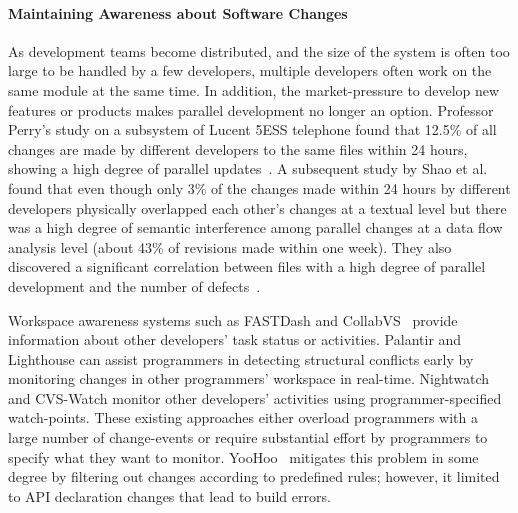 \documentclass[runningheads,a4paper]{llncs}
\begin{document}
\paragraph{Maintaining Awareness about Software Changes} 
As development teams become distributed, and the size of the system is often too large to be handled by a few developers, multiple developers often work on the same module at the same time. In addition, the market-pressure to develop new features or products makes parallel development no longer an option.
Professor Perry's study on a subsystem of Lucent 5ESS telephone found that 12.5\% of all changes are made by different developers to the same files within 24 hours, showing a high degree of parallel updates~\cite{Perry2001:parallel}. A subsequent study by Shao et al. found that even though only 3\% of the changes made within 24 hours by different developers physically overlapped each other's changes at a textual level but there was a high degree of semantic interference among parallel changes at a data flow analysis level (about 43\% of revisions made within one week). They also discovered a significant correlation between files with a high degree of parallel development and the number of defects~\cite{Shao2007:interference}. 


Workspace awareness systems such as FASTDash \cite{Biehl2007} and CollabVS~\cite{Hegde2008:collabVS} provide information about other developers' task status or activities. Palantir \cite{Sarma2003} and Lighthouse \cite{daSilva2006} can assist programmers in detecting structural conflicts early by monitoring changes in other programmers' workspace in real-time. Nightwatch \cite{OReilly2003} and CVS-Watch \cite{Berliner1990:cvs2} monitor other developers' activities using programmer-specified watch-points. These existing approaches either overload programmers with a large number of change-events or require substantial effort by programmers to specify what they want to monitor. YooHoo~\cite{Holmes2010:Yoohoo} mitigates this problem in some degree by filtering out changes according to predefined rules; however, it limited to API declaration changes that lead to build errors. 
\end{document}

